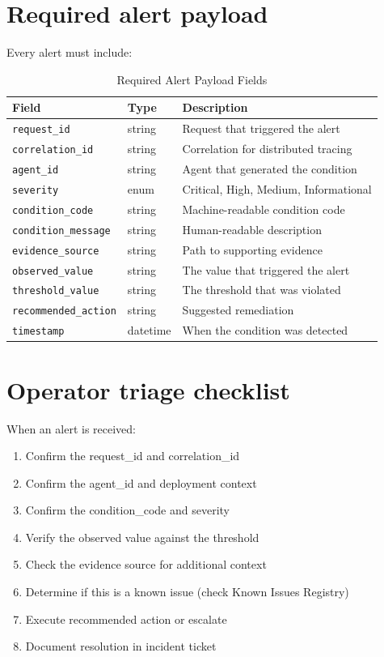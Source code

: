 \section{Required alert payload}

Every alert must include:

\begin{table}[htbp]
\centering
\footnotesize
\caption{Required Alert Payload Fields}
\begin{tabularx}{\textwidth}{@{}l l X@{}}
\toprule
\textbf{Field} & \textbf{Type} & \textbf{Description} \\
\midrule
\texttt{request\_id} & string & Request that triggered the alert \\
\texttt{correlation\_id} & string & Correlation for distributed tracing \\
\texttt{agent\_id} & string & Agent that generated the condition \\
\texttt{severity} & enum & Critical, High, Medium, Informational \\
\texttt{condition\_code} & string & Machine-readable condition code \\
\texttt{condition\_message} & string & Human-readable description \\
\texttt{evidence\_source} & string & Path to supporting evidence \\
\texttt{observed\_value} & string & The value that triggered the alert \\
\texttt{threshold\_value} & string & The threshold that was violated \\
\texttt{recommended\_action} & string & Suggested remediation \\
\texttt{timestamp} & datetime & When the condition was detected \\
\bottomrule
\end{tabularx}
\end{table}

\section{Operator triage checklist}

When an alert is received:

\begin{enumerate}
  \item Confirm the request\_id and correlation\_id
  \item Confirm the agent\_id and deployment context
  \item Confirm the condition\_code and severity
  \item Verify the observed value against the threshold
  \item Check the evidence source for additional context
  \item Determine if this is a known issue (check Known Issues Registry)
  \item Execute recommended action or escalate
  \item Document resolution in incident ticket
\end{enumerate}

